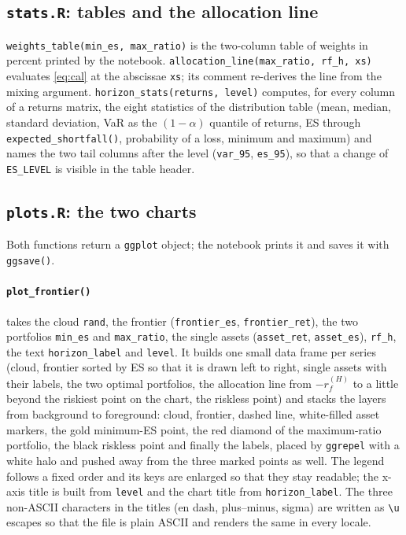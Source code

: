 \documentclass[11pt,a4paper]{article}
\newcommand{\code}[1]{\texttt{#1}}
\newcommand{\file}[1]{\texttt{#1}}
\theoremstyle{plain}
\theoremstyle{remark}
\begin{document}
\subsection{\file{stats.R}: tables and the allocation line}

\code{weights\_table(min\_es, max\_ratio)} is the two-column table of weights
in percent printed by the notebook. \code{allocation\_line(max\_ratio, rf\_h,
xs)} evaluates \eqref{eq:cal} at the abscissae \code{xs}; its comment
re-derives the line from the mixing argument.
\code{horizon\_stats(returns, level)} computes, for every column of a
returns matrix, the eight statistics of the distribution table (mean,
median, standard deviation, VaR as the $(1-\alpha)$ quantile of returns, ES
through \code{expected\_shortfall()}, probability of a loss, minimum and
maximum) and names the two tail columns after the level
(\code{var\_95}, \code{es\_95}), so that a change of \code{ES\_LEVEL} is
visible in the table header.

\subsection{\file{plots.R}: the two charts}

Both functions return a \code{ggplot} object; the notebook prints it and
saves it with \code{ggsave()}.

\paragraph{\code{plot\_frontier()}} takes the cloud \code{rand}, the frontier (\code{frontier\_es}, \code{frontier\_ret}), the two portfolios \code{min\_es} and \code{max\_ratio}, the single assets (\code{asset\_ret}, \code{asset\_es}), \code{rf\_h}, the text \code{horizon\_label} and \code{level}. It builds one small
data frame per series (cloud, frontier sorted by ES so that it is drawn
left to right, single assets with their labels, the two optimal portfolios,
the allocation line from $-r_f^{(H)}$ to a little beyond the riskiest point
on the chart, the riskless point) and stacks the layers from background to
foreground: cloud, frontier, dashed line, white-filled asset markers, the
gold minimum-ES point, the red diamond of the maximum-ratio portfolio, the
black riskless point and finally the labels, placed by \code{ggrepel} with a
white halo and pushed away from the three marked points as well. The legend
follows a fixed order and its keys are enlarged so that they stay readable;
the x-axis title is built from \code{level} and the chart title from
\code{horizon\_label}. The three
non-ASCII characters in the titles (en dash, plus--minus, sigma) are
written as \code{\textbackslash u} escapes so that the file is plain ASCII
and renders the same in every locale.
\end{document}
